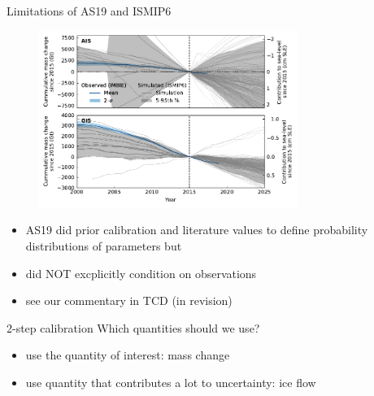 \documentclass[hide notes,intlimits]{beamer}
\begin{document}
\begin{frame}{Limitations of AS19 and ISMIP6}
  \begin{figure}
    \includegraphics[width=0.75\textwidth]{IS_historical}
  \end{figure}
\begin{itemize}
\item AS19 did prior calibration and literature values to define probability distributions of parameters \alert{but}
\item did \alert{NOT} excplicitly condition on observations
\item see our commentary in TCD (in revision)
\end{itemize}
\note[item]{}
\end{frame}

\begin{frame}{2-step calibration}
Which quantities should we use?
\begin{itemize}
\item use the quantity of interest: mass change
\item use quantity that contributes a lot to uncertainty: ice flow
\end{itemize}
\note[item]{}
\end{frame}
\end{document}

